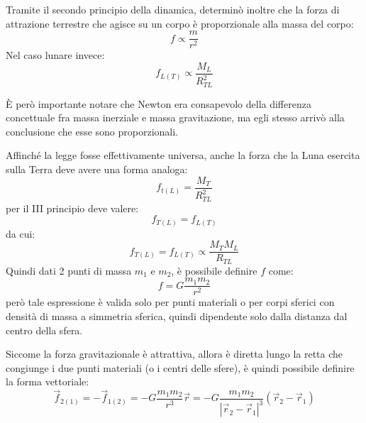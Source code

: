 \documentclass[11pt, a4paper, openright]{book}
\theoremstyle{plain}
\theoremstyle{definition}
\begin{document}
Tramite il secondo principio della dinamica, determinò inoltre che la forza di attrazione terrestre che agisce su un corpo è proporzionale alla massa del corpo:
\begin{equation}
    f \propto \frac{m}{r^2}
\end{equation}
Nel caso lunare invece:
\begin{equation}
    f_{L(T)} \propto \frac{M_L}{R_{TL}^2}
\end{equation}

È però importante notare che Newton era consapevolo della differenza concettuale fra massa inerziale e massa gravitazione, ma egli stesso arrivò alla conclusione che esse sono proporzionali.

Affinché la legge fosse effettivamente universa, anche la forza che la Luna esercita sulla Terra deve avere una forma analoga:
\begin{equation}
    f_{t(L)} = \frac{M_T}{R_{TL}^2}
\end{equation} 
per il III principio deve valere:
\begin{equation}
    f_{T(L)} = f_{L(T)}
\end{equation}
da cui:
\begin{equation}
    f_{T(L)} = f_{L(T)} \propto \frac{M_TM_L}{R_{TL}}
\end{equation}
Quindi dati 2 punti di massa $m_1$ e $m_2$, è possibile definire $f$ come:
\begin{equation}
    f = G\frac{m_1m_2}{r^2}
\end{equation}
però tale espressione è valida solo per punti materiali o per corpi sferici con densità di massa a simmetria sferica, quindi dipendente solo dalla distanza dal centro della sfera.

Siccome la forza gravitazionale è attrattiva, allora è diretta lungo la retta che congiunge i due punti materiali (o i centri delle sfere), è quindi possibile definire la forma vettoriale:
\begin{equation}
    \vec{f}_{2(1)} = -\vec{f}_{1(2)} = - G\frac{m_1m_2}{r^3}\vec{r} = - G \frac{m_1 m_2}{|\vec{r}_2 - \vec{r}_1|^3}(\vec{r}_2 - \vec{r}_1)
    \label{eq:gravitazioneUniversaleVettoriale}
\end{equation}
\end{document}
